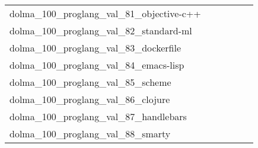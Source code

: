 {\begin{longtable}{m{6cm}m{1.7cm}m{1.7cm}m{1.7cm}m{1.7cm}m{1.7cm}}
	dolma\_100\_proglang\_val\_81\_objective-c++  & \colorbox[HTML]{bbe395}{\makebox[\mywidth][c]{2.18}} & \colorbox[HTML]{dcf1a5}{\makebox[\mywidth][c]{2.19}} & \colorbox[HTML]{ffffe5}{\makebox[\mywidth][c]{2.40}} & \colorbox[HTML]{bae294}{\makebox[\mywidth][c]{2.17}} & \colorbox[HTML]{77c578}{\makebox[\mywidth][c]{2.16}}\\
	dolma\_100\_proglang\_val\_82\_standard-ml  & \colorbox[HTML]{77c578}{\makebox[\mywidth][c]{3.57}} & \colorbox[HTML]{fcfdd5}{\makebox[\mywidth][c]{4.05}} & \colorbox[HTML]{ffffe5}{\makebox[\mywidth][c]{4.79}} & \colorbox[HTML]{ebf7b0}{\makebox[\mywidth][c]{3.81}} & \colorbox[HTML]{e3f4aa}{\makebox[\mywidth][c]{3.77}}\\
	dolma\_100\_proglang\_val\_83\_dockerfile  & \colorbox[HTML]{eaf7af}{\makebox[\mywidth][c]{4.08}} & \colorbox[HTML]{fdfedb}{\makebox[\mywidth][c]{4.17}} & \colorbox[HTML]{ffffe5}{\makebox[\mywidth][c]{4.37}} & \colorbox[HTML]{77c578}{\makebox[\mywidth][c]{4.01}} & \colorbox[HTML]{d1ec9f}{\makebox[\mywidth][c]{4.05}}\\
	dolma\_100\_proglang\_val\_84\_emacs-lisp  & \colorbox[HTML]{def2a6}{\makebox[\mywidth][c]{3.83}} & \colorbox[HTML]{ddf1a6}{\makebox[\mywidth][c]{3.83}} & \colorbox[HTML]{ffffe5}{\makebox[\mywidth][c]{4.44}} & \colorbox[HTML]{d0ec9e}{\makebox[\mywidth][c]{3.80}} & \colorbox[HTML]{77c578}{\makebox[\mywidth][c]{3.72}}\\
	dolma\_100\_proglang\_val\_85\_scheme  & \colorbox[HTML]{84cb7d}{\makebox[\mywidth][c]{2.78}} & \colorbox[HTML]{e0f2a8}{\makebox[\mywidth][c]{2.86}} & \colorbox[HTML]{ffffe5}{\makebox[\mywidth][c]{3.40}} & \colorbox[HTML]{cdeb9d}{\makebox[\mywidth][c]{2.84}} & \colorbox[HTML]{77c578}{\makebox[\mywidth][c]{2.77}}\\
	dolma\_100\_proglang\_val\_86\_clojure  & \colorbox[HTML]{7dc87b}{\makebox[\mywidth][c]{3.18}} & \colorbox[HTML]{dff2a7}{\makebox[\mywidth][c]{3.30}} & \colorbox[HTML]{ffffe5}{\makebox[\mywidth][c]{4.00}} & \colorbox[HTML]{cdeb9d}{\makebox[\mywidth][c]{3.26}} & \colorbox[HTML]{77c578}{\makebox[\mywidth][c]{3.17}}\\
	dolma\_100\_proglang\_val\_87\_handlebars  & \colorbox[HTML]{def2a6}{\makebox[\mywidth][c]{1.79}} & \colorbox[HTML]{c8e89a}{\makebox[\mywidth][c]{1.79}} & \colorbox[HTML]{ffffe5}{\makebox[\mywidth][c]{1.88}} & \colorbox[HTML]{addd8e}{\makebox[\mywidth][c]{1.78}} & \colorbox[HTML]{77c578}{\makebox[\mywidth][c]{1.78}}\\
	dolma\_100\_proglang\_val\_88\_smarty  & \colorbox[HTML]{9ad486}{\makebox[\mywidth][c]{2.30}} & \colorbox[HTML]{edf8b2}{\makebox[\mywidth][c]{2.35}} & \colorbox[HTML]{ffffe5}{\makebox[\mywidth][c]{2.58}} & \colorbox[HTML]{77c578}{\makebox[\mywidth][c]{2.29}} & \colorbox[HTML]{95d284}{\makebox[\mywidth][c]{2.30}}\\

\end{longtable}}
